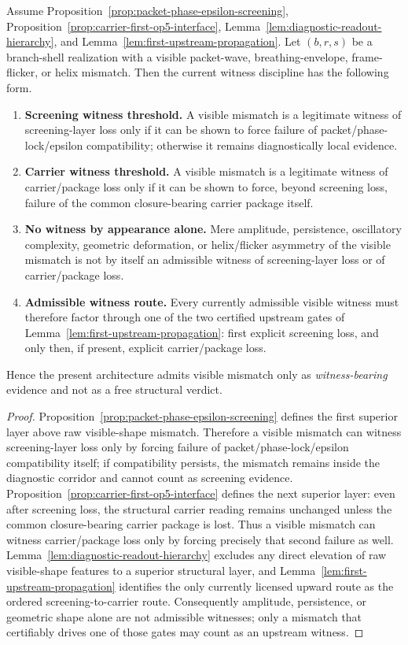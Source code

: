 \begin{lemma}
\label{lem:first-diagnostic-witness}
Assume Proposition~\ref{prop:packet-phase-epsilon-screening}, Proposition~\ref{prop:carrier-first-op5-interface}, Lemma~\ref{lem:diagnostic-readout-hierarchy}, and Lemma~\ref{lem:first-upstream-propagation}. Let $(b,r,s)$ be a branch-shell realization with a visible packet-wave, breathing-envelope, frame-flicker, or helix mismatch. Then the current witness discipline has the following form.
\begin{enumerate}[leftmargin=2em,label=(\roman*)]
\item \textbf{Screening witness threshold.} A visible mismatch is a legitimate witness of screening-layer loss only if it can be shown to force failure of packet/phase-lock/epsilon compatibility; otherwise it remains diagnostically local evidence.
\item \textbf{Carrier witness threshold.} A visible mismatch is a legitimate witness of carrier/package loss only if it can be shown to force, beyond screening loss, failure of the common closure-bearing carrier package itself.
\item \textbf{No witness by appearance alone.} Mere amplitude, persistence, oscillatory complexity, geometric deformation, or helix/flicker asymmetry of the visible mismatch is not by itself an admissible witness of screening-layer loss or of carrier/package loss.
\item \textbf{Admissible witness route.} Every currently admissible visible witness must therefore factor through one of the two certified upstream gates of Lemma~\ref{lem:first-upstream-propagation}: first explicit screening loss, and only then, if present, explicit carrier/package loss.
\end{enumerate}
Hence the present architecture admits visible mismatch only as \emph{witness-bearing} evidence and not as a free structural verdict.
\end{lemma}

\begin{proof}
Proposition~\ref{prop:packet-phase-epsilon-screening} defines the first superior layer above raw visible-shape mismatch. Therefore a visible mismatch can witness screening-layer loss only by forcing failure of packet/phase-lock/epsilon compatibility itself; if compatibility persists, the mismatch remains inside the diagnostic corridor and cannot count as screening evidence. Proposition~\ref{prop:carrier-first-op5-interface} defines the next superior layer: even after screening loss, the structural carrier reading remains unchanged unless the common closure-bearing carrier package is lost. Thus a visible mismatch can witness carrier/package loss only by forcing precisely that second failure as well. Lemma~\ref{lem:diagnostic-readout-hierarchy} excludes any direct elevation of raw visible-shape features to a superior structural layer, and Lemma~\ref{lem:first-upstream-propagation} identifies the only currently licensed upward route as the ordered screening-to-carrier route. Consequently amplitude, persistence, or geometric shape alone are not admissible witnesses; only a mismatch that certifiably drives one of those gates may count as an upstream witness.
\end{proof}

